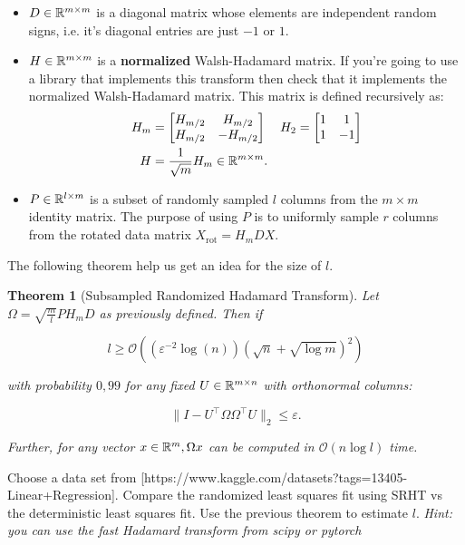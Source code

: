 \documentclass[11pt]{article}
\newcommand\bigO[1]{{\ensuremath{\mathcal{O}(#1)}}}
\newtheorem{theorem}{Theorem}
\begin{document}
\begin{itemize}
    \item $D \in \mathbb{R}^{m \times m}$ is a diagonal matrix whose elements are independent random signs, i.e. it's diagonal entries are just $-1$ or $1$.
    \item $H \in \mathbb{R}^{m \times m}$ is a \textbf{normalized} Walsh-Hadamard matrix. If you're going to use a library that implements this transform then check that it implements the normalized Walsh-Hadamard matrix. This matrix is defined recursively as:
    \begin{align*}
    H_m &= \begin{bmatrix} H_{m/2} & H_{m/2} \\ H_{m/2} & -H_{m/2} \end{bmatrix} & H_2 &= \begin{bmatrix} 1 & 1 \\ 1 & -1 \end{bmatrix} \\
    H &= \frac{1}{\sqrt{m}} H_m \in \mathbb{R}^{m \times m}.
    \end{align*}
    \item $P \in \mathbb{R}^{l \times m}$ is a subset of randomly sampled $l$ columns from the $m \times m$ identity matrix. The purpose of using $P$ is to uniformly sample $r$ columns from the rotated data matrix $X_{\text{rot}} = H_{m}DX$.
\end{itemize}

The following theorem help us get an idea for the size of $l$.

\begin{theorem}[Subsampled Randomized Hadamard Transform]
Let $\Omega = \sqrt{\frac{m}{l}}PH_{m}D$ as previously defined. Then if

\[ l \geq \bigO{( \varepsilon^{-2}\log(n)) (\sqrt{n} + \sqrt{\log{m}})^2 }\]

with probability $0,99$ for any fixed $U \in \mathbb{R}^{m \times n}$ with orthonormal columns:

\[ \| I - U^\top \Omega \Omega^\top U\|_2 \leq \varepsilon. \]

Further, for any vector $x \in \mathbb{R}^{m}, \Omega x$ can be computed in $\bigO{n \log{l}}$ time.

\end{theorem}

Choose a data set from \href{https://www.kaggle.com/datasets?tags=13405-Linear+Regression}[https://www.kaggle.com/datasets?tags=13405-Linear+Regression]. Compare the randomized least squares fit using SRHT vs the deterministic least squares fit. Use the previous theorem to estimate $l$. \textit{Hint: you can use the fast Hadamard transform from scipy or pytorch}
\end{document}
